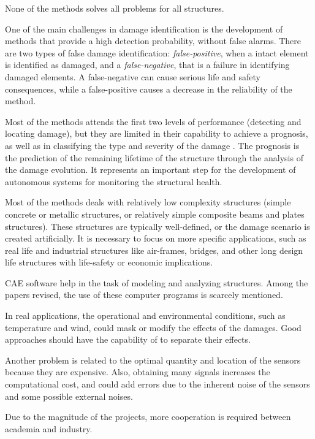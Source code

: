 \begin{description}[style=sameline]
\item[Lack of robustness] None of the methods solves all problems for all structures.

\item[Occurrence of False alarms] One of the main challenges in damage identification is the development of methods that provide a high detection probability, without false alarms. There are two types of false damage identification: \textit{false-positive}, when a intact element is identified as damaged, and a \textit{false-negative}, that is a failure in identifying damaged elements. A false-negative can cause serious life and safety consequences, while a false-positive causes a decrease in the reliability of the method.

\item[Low-performance level] Most of the methods attends the first two levels of performance (detecting and locating damage), but they are limited in their capability to achieve a prognosis, as well as in classifying the type and severity of the damage \cite{Ooijevaar2014}. The prognosis is the prediction of the remaining lifetime of the structure through the analysis of the damage evolution. It represents an important step for the development of autonomous systems for monitoring the structural health.

\item[Low complexity structures] Most of the methods deals with relatively low complexity structures (simple concrete or metallic structures, or relatively simple composite beams and plates structures). These structures are typically well-defined, or the damage scenario is created artificially. It is necessary to focus on more specific applications, such as real life and industrial structures like air-frames, bridges, and other long design life structures with life-safety or economic implications.

\item[No integration with engineering software] CAE software help in the task of modeling and analyzing structures. Among the papers revised, the use of these computer programs is scarcely mentioned.

\item[No operational and environmental variability] In real applications, the operational and environmental conditions, such as temperature and wind, could mask or modify the effects of the damages. Good approaches should have the capability of to separate their effects.

\item[Integrated sensor and network] Another problem is related to the optimal quantity and location of the sensors because they are expensive. Also, obtaining many signals increases the computational cost, and could add errors due to the inherent noise of the sensors and some possible external noises.

\item[Cooperation] Due to the magnitude of the projects, more cooperation is required between academia and industry.
 
\end{description}

